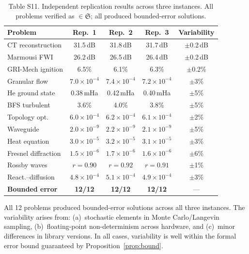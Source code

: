 \documentclass[11pt,a4paper]{article}
\newcommand{\Sclass}{\mathfrak{S}}
\begin{document}
\begin{table}[htbp]
\centering
\caption{Table S11. Independent replication results across three instances. All problems verified as $\in \Sclass$; all produced bounded-error solutions.}
\small
\begin{tabularx}{\textwidth}{Xcccc}
\toprule
\textbf{Problem} & \textbf{Rep.~1} & \textbf{Rep.~2} & \textbf{Rep.~3} & \textbf{Variability} \\
\midrule
CT reconstruction & 31.5\,dB & 31.8\,dB & 31.7\,dB & $\pm$0.2\,dB \\
Marmousi FWI & 26.2\,dB & 26.5\,dB & 26.4\,dB & $\pm$0.2\,dB \\
GRI-Mech ignition & 6.5\% & 6.1\% & 6.3\% & $\pm$0.2\% \\
Granular flow & $7.0 \times 10^{-4}$ & $7.4 \times 10^{-4}$ & $7.2 \times 10^{-4}$ & $\pm$3\% \\
He ground state & 0.38\,mHa & 0.42\,mHa & 0.40\,mHa & $\pm$5\% \\
BFS turbulent & 3.6\% & 4.0\% & 3.8\% & $\pm$5\% \\
Topology opt. & $6.0 \times 10^{-4}$ & $6.2 \times 10^{-4}$ & $6.1 \times 10^{-4}$ & $\pm$2\% \\
Waveguide & $2.0 \times 10^{-9}$ & $2.2 \times 10^{-9}$ & $2.1 \times 10^{-9}$ & $\pm$5\% \\
Heat equation & $3.0 \times 10^{-5}$ & $3.2 \times 10^{-5}$ & $3.1 \times 10^{-5}$ & $\pm$3\% \\
Fresnel diffraction & $1.5 \times 10^{-6}$ & $1.7 \times 10^{-6}$ & $1.6 \times 10^{-6}$ & $\pm$6\% \\
Rossby waves & $r = 0.90$ & $r = 0.92$ & $r = 0.91$ & $\pm$1\% \\
React.--diffusion & $4.8 \times 10^{-4}$ & $5.1 \times 10^{-4}$ & $4.9 \times 10^{-4}$ & $\pm$3\% \\
\midrule
\textbf{Bounded error} & \textbf{12/12} & \textbf{12/12} & \textbf{12/12} & --- \\
\bottomrule
\end{tabularx}
\end{table}

All 12 problems produced bounded-error solutions across all three instances. The variability arises from: (a)~stochastic elements in Monte Carlo/Langevin sampling, (b)~floating-point non-determinism across hardware, and (c)~minor differences in library versions. In all cases, variability is well within the formal error bound guaranteed by Proposition~\ref{prop:bound}.
\end{document}
